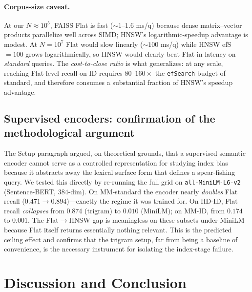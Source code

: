 \documentclass[conference]{IEEEtran}
\begin{document}
\paragraph{Corpus-size caveat.}
At our $N{\approx}10^5$, FAISS Flat is fast ($\sim 1$--$1.6$ ms/q) because dense matrix--vector products parallelize well across SIMD; HNSW's logarithmic-speedup advantage is modest. At $N{=}10^7$ Flat would slow linearly (${\sim}100$ ms/q) while HNSW efS$=100$ grows logarithmically, so HNSW would clearly beat Flat in latency on \emph{standard} queries. The \emph{cost-to-close ratio} is what generalizes: at any scale, reaching Flat-level recall on ID requires $80$--$160\times$ the \texttt{efSearch} budget of standard, and therefore consumes a substantial fraction of HNSW's speedup advantage.

\subsection{Supervised encoders: confirmation of the methodological argument}\label{sec:supervised-confirm}

The Setup paragraph argued, on theoretical grounds, that a supervised semantic encoder cannot serve as a controlled representation for studying index bias because it abstracts away the lexical surface form that defines a spear-fishing query. We tested this directly by re-running the full grid on \texttt{all-MiniLM-L6-v2} (Sentence-BERT, $384$-dim). On MM-standard the encoder nearly \emph{doubles} Flat recall ($0.471 \to 0.894$)---exactly the regime it was trained for. On HD-ID, Flat recall \emph{collapses} from $0.874$ (trigram) to $0.010$ (MiniLM); on MM-ID, from $0.174$ to $0.001$. The Flat$\to$HNSW gap is meaningless on these subsets under MiniLM because Flat itself returns essentially nothing relevant. This is the predicted ceiling effect and confirms that the trigram setup, far from being a baseline of convenience, is the necessary instrument for isolating the index-stage failure.

\section{Discussion and Conclusion}
\end{document}
